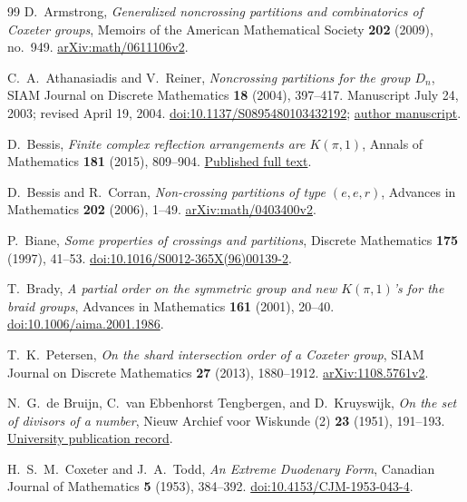 \documentclass[11pt]{article}
\theoremstyle{definition}
\begin{document}
\begin{thebibliography}{99}
D.~Armstrong, \emph{Generalized noncrossing partitions and combinatorics
of Coxeter groups}, Memoirs of the American Mathematical Society
\textbf{202} (2009), no.~949.
\href{https://arxiv.org/abs/math/0611106v2}{arXiv:math/0611106v2}.

C.~A.~Athanasiadis and V.~Reiner, \emph{Noncrossing partitions for the
group $D_n$}, SIAM Journal on Discrete Mathematics \textbf{18} (2004),
397--417. Manuscript July 24, 2003; revised April 19, 2004.
\href{https://doi.org/10.1137/S0895480103432192}{doi:10.1137/S0895480103432192};
\href{https://www-users.cse.umn.edu/~reiner/Papers/ncd.pdf}{author manuscript}.

D.~Bessis, \emph{Finite complex reflection arrangements are
$K(\pi,1)$}, Annals of Mathematics \textbf{181} (2015), 809--904.
\href{https://annals.math.princeton.edu/wp-content/uploads/annals-v181-n3-p01-p.pdf}{Published full text}.

D.~Bessis and R.~Corran, \emph{Non-crossing partitions of type
$(e,e,r)$}, Advances in Mathematics \textbf{202} (2006), 1--49.
\href{https://arxiv.org/abs/math/0403400v2}{arXiv:math/0403400v2}.

P.~Biane, \emph{Some properties of crossings and partitions},
Discrete Mathematics \textbf{175} (1997), 41--53.
\href{https://doi.org/10.1016/S0012-365X(96)00139-2}{doi:10.1016/S0012-365X(96)00139-2}.

T.~Brady, \emph{A partial order on the symmetric group and new
$K(\pi,1)$'s for the braid groups}, Advances in Mathematics
\textbf{161} (2001), 20--40.
\href{https://doi.org/10.1006/aima.2001.1986}{doi:10.1006/aima.2001.1986}.

T.~K.~Petersen, \emph{On the shard intersection order of a Coxeter group},
SIAM Journal on Discrete Mathematics \textbf{27} (2013), 1880--1912.
\href{https://arxiv.org/abs/1108.5761v2}{arXiv:1108.5761v2}.

N.~G.~de Bruijn, C.~van Ebbenhorst Tengbergen, and D.~Kruyswijk,
\emph{On the set of divisors of a number}, Nieuw Archief voor
Wiskunde (2) \textbf{23} (1951), 191--193.
\href{https://research.tue.nl/en/publications/on-the-set-of-divisors-of-a-number/}{University publication record}.

H.~S.~M.~Coxeter and J.~A.~Todd, \emph{An Extreme Duodenary Form},
Canadian Journal of Mathematics \textbf{5} (1953), 384--392.
\href{https://doi.org/10.4153/CJM-1953-043-4}{doi:10.4153/CJM-1953-043-4}.


\end{thebibliography}
\end{document}
